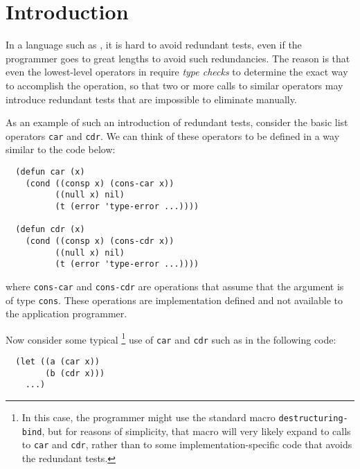 \section{Introduction}

In a language such as \commonlisp{}, it is hard to avoid redundant
tests, even if the programmer goes to great lengths to avoid such
redundancies.  The reason is that even the lowest-level operators in
\commonlisp{} require \emph{type checks} to determine the exact way to
accomplish the operation, so that two or more calls to similar
operators may introduce redundant tests that are impossible to
eliminate manually.

As an example of such an introduction of redundant tests, consider the
basic list operators \texttt{car} and \texttt{cdr}.  We can think of
these operators to be defined in a way similar to the code below:

\begin{verbatim}
  (defun car (x)
    (cond ((consp x) (cons-car x))
          ((null x) nil)
          (t (error 'type-error ...))))

  (defun cdr (x)
    (cond ((consp x) (cons-cdr x))
          ((null x) nil)
          (t (error 'type-error ...))))
\end{verbatim}

\noindent
where \texttt{cons-car} and \texttt{cons-cdr} are operations that
assume that the argument is of type \texttt{cons}.  These operations
are implementation defined and not available to the application
programmer.

Now consider some typical%
\footnote{In this case, the programmer might use the standard macro
  \texttt{destructuring-bind}, but for reasons of simplicity, that
  macro will very likely expand to calls to \texttt{car} and
  \texttt{cdr}, rather than to some implementation-specific code that
  avoids the redundant tests.}
use of \texttt{car} and \texttt{cdr} such as
in the following code:

\begin{verbatim}
  (let ((a (car x))
        (b (cdr x)))
    ...)
\end{verbatim}

